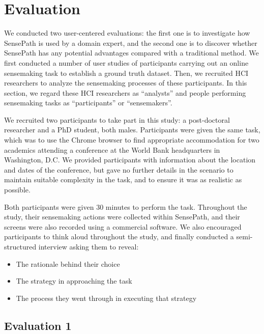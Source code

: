 \section{Evaluation}

We conducted two user-centered evaluations: the first one is to investigate how SensePath is used by a domain expert, and the second one is to discover whether SensePath has any potential advantages compared with a traditional method. We first conducted a number of user studies of participants carrying out an online sensemaking task to establish a ground truth dataset. Then, we recruited HCI researchers to analyze the sensemaking processes of these participants. In this section, we regard these HCI researchers as ``analysts'' and people performing sensemaking tasks as ``participants'' or ``sensemakers''.

We recruited two participants to take part in this study: a post-doctoral researcher and a PhD student, both males. Participants were given the same task, which was to use the Chrome browser to find appropriate accommodation for two academics attending a conference at the World Bank headquarters in Washington, D.C. We provided participants with information about the location and dates of the conference, but gave no further details in the scenario to maintain suitable complexity in the task, and to ensure it was as realistic as possible.

Both participants were given 30 minutes to perform the task. Throughout the study, their sensemaking actions were collected within SensePath, and their screens were also recorded using a commercial software. We also encouraged participants to think aloud throughout the study, and finally conducted a semi-structured interview asking them to reveal:

\begin{itemize}
	\item The rationale behind their choice
	\item The strategy in approaching the task
	\item The process they went through in executing that strategy
\end{itemize}

\subsection{Evaluation 1}

